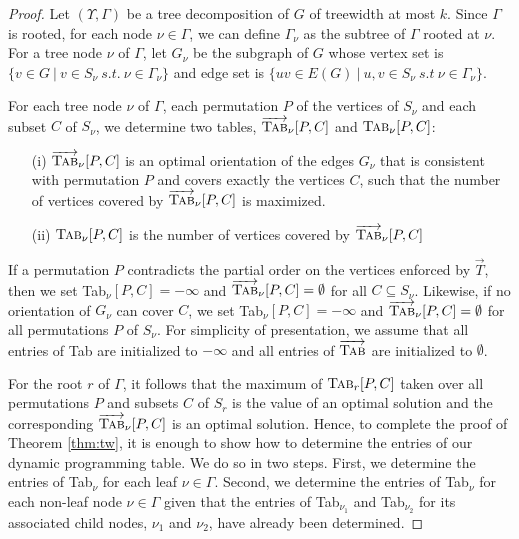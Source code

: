 \documentclass{article}
\newcommand{\ora}{\overrightarrow}
\begin{document}
\begin{proof}
Let $(\Upsilon, \Gamma)$  be a tree decomposition of $G$ of treewidth at most $k$.
Since $\Gamma$ is rooted, for each node $\nu \in \Gamma$, we can define $\Gamma_\nu$ as the subtree of $\Gamma$ rooted at $\nu$.
For a tree node $\nu$ of $\Gamma$, let $G_{\nu}$ be the subgraph of $G$ whose vertex set is $\{v \in G~|~ v \in S_\nu~s.t.~\nu \in \Gamma_\nu\}$ and edge set is $\{uv \in E(G)~|~ u,v \in S_\nu~s.t~\nu \in \Gamma_\nu\}$.  

For each tree node $\nu$ of $\Gamma$, each permutation $P$ of the vertices of $S_\nu$ 
and each subset $C$ of $S_\nu$, we determine two tables, $\ora {\mbox{\sc Tab}}_\nu[P,C]$ and $ {\mbox {\sc Tab}}_\nu[P,C]$:
\begin{enumerate}
\item [(i)] $\ora {\mbox{\sc Tab}}_\nu[P,C]$ is an optimal orientation of the edges $G_{\nu}$
that is consistent with permutation $P$ and covers exactly the vertices $C$, such that the number of vertices covered by $\ora {\mbox{\sc Tab}}_\nu[P,C]$ is maximized.
\item [(ii)] ${\mbox {\sc Tab}}_\nu[P,C]$ is the number of vertices covered by $\ora {\mbox{\sc Tab}}_\nu[P,C]$
\end{enumerate}
If a permutation $P$ contradicts the partial order on the vertices enforced by $\ora T$, then we set {\sc Tab}$_\nu[P,C]=-\infty$ and $\ora {\mbox{\sc Tab}}_\nu[P,C] = \emptyset$ for all $C\subseteq S_{\nu}$.  Likewise, if no orientation of $G_\nu$ can cover $C$, we set {\sc Tab}$_\nu[P,C]=-\infty$ and $\ora {\mbox{\sc Tab}}_\nu[P,C] = \emptyset$ for all permutations $P$ of $S_\nu$.  For simplicity of presentation, we assume that all entries of {\sc Tab} are initialized to $-\infty$ and all entries of $\ora{\mbox{\sc Tab}}$ are initialized to $\emptyset$.

For the root $r$ of $\Gamma$, it follows that the maximum of ${\mbox {\sc Tab}}_r[P,C]$ taken over all permutations $P$ and subsets $C$ of $S_r$ is the value of an optimal solution and the corresponding $\ora {\mbox{\sc Tab}}_\nu[P,C]$ is an optimal solution.
Hence, to complete the proof of Theorem \ref{thm:tw}, it is enough to show how to determine the entries of our dynamic programming table.
We do so in two steps.
First, we determine the entries of {\sc Tab}$_\nu$ for each leaf $\nu \in \Gamma$.
Second, we determine the entries of {\sc Tab}$_\nu$ for each non-leaf node $\nu \in \Gamma$ given that the entries of {\sc Tab}$_{\nu_1}$ and {\sc Tab}$_{\nu_2}$ for its associated child nodes, $\nu_1$ and $\nu_2$, have already been determined.  


\end{proof}
\end{document}
